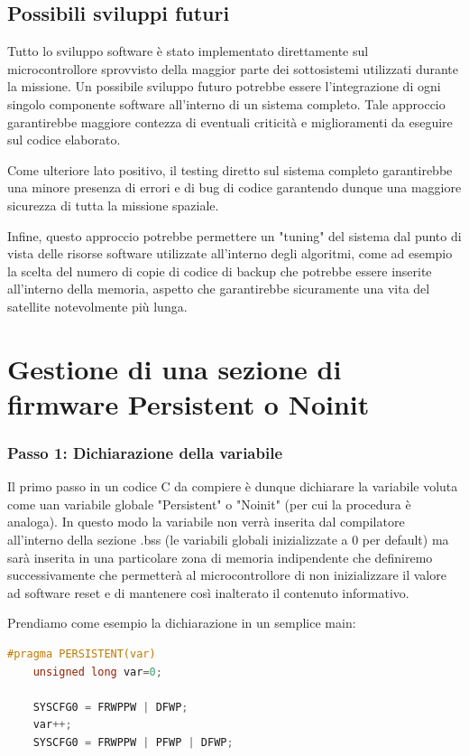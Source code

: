 \documentclass[LaM,binding=0.6cm]{../sapthesis}
\begin{document}
\section{Possibili sviluppi futuri}
Tutto lo sviluppo software è stato implementato direttamente sul microcontrollore sprovvisto della maggior parte dei sottosistemi utilizzati durante la missione. Un possibile
sviluppo futuro potrebbe essere l'integrazione di ogni singolo componente software all'interno di un sistema completo. Tale approccio garantirebbe maggiore contezza
di eventuali criticità e miglioramenti da eseguire sul codice elaborato. 

Come ulteriore lato positivo, il testing diretto sul sistema completo garantirebbe una  minore presenza di errori e di bug di codice garantendo dunque una maggiore 
sicurezza di tutta la missione spaziale. 

Infine, questo approccio potrebbe permettere un "tuning" del sistema dal punto di vista delle  risorse software utilizzate all'interno degli algoritmi, come ad esempio la scelta del numero di copie di codice di backup che potrebbe essere inserite all'interno della memoria,
aspetto che garantirebbe sicuramente una vita del satellite notevolmente più lunga.
\chapter{Gestione di una sezione di firmware Persistent o Noinit}

\subsection{Passo 1: Dichiarazione della variabile}
Il primo passo in un codice C da compiere è dunque dichiarare la variabile voluta come uan variabile globale "Persistent" o "Noinit" (per cui la procedura è analoga). In questo modo la variabile non verrà inserita dal compilatore all'interno della sezione .bss (le variabili globali inizializzate a 0 per default) ma sarà inserita in una particolare zona di memoria indipendente che definiremo successivamente che permetterà al microcontrollore di non inizializzare il valore ad software reset
e di mantenere così inalterato il contenuto informativo.


Prendiamo come esempio la dichiarazione in un semplice main:
\begin{lstlisting}[language=C]
    #pragma PERSISTENT(var)  
    unsigned long var=0;  
      
    SYSCFG0 = FRWPPW | DFWP;           
    var++;                             
    SYSCFG0 = FRWPPW | PFWP | DFWP; 

\end{lstlisting}
\end{document}
